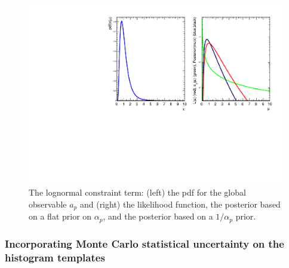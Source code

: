 \documentclass{cernrep}
\begin{document}
\begin{figure}[htbp]
\begin{center}
\includegraphics[width=.6\textwidth]{lognormal}
\caption{The lognormal constraint term: (left) the pdf for the global observable $a_p$ and (right) the likelihood function, the posterior based on a flat prior on $\alpha_p$, and the posterior based on a $1/\alpha_p$ prior.}
\label{fig:lognormal}
\end{center}
\end{figure}



\subsubsection{Incorporating Monte Carlo statistical uncertainty on the histogram templates}
\end{document}
